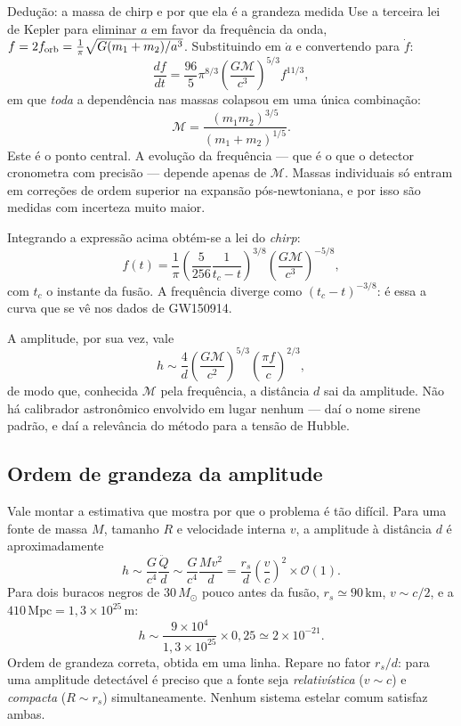 \documentclass[11pt,a4paper]{article}
\begin{document}
\begin{lessonblock}[borderline west={2pt}{0pt}{astroGold}]{Dedução: a massa de chirp e por que ela é a grandeza medida}
Use a terceira lei de Kepler para eliminar $a$ em favor da frequência da onda, $f=2f_{\rm orb}=\frac{1}{\pi}\sqrt{G(m_1+m_2)/a^{3}}$. Substituindo em $\dot{a}$ e convertendo para $\dot{f}$:
\[
\frac{df}{dt}=\frac{96}{5}\pi^{8/3}\left(\frac{G\mathcal{M}}{c^{3}}\right)^{5/3}f^{11/3},
\]
em que \emph{toda} a dependência nas massas colapsou em uma única combinação:
\[
\mathcal{M}=\frac{(m_1m_2)^{3/5}}{(m_1+m_2)^{1/5}}.
\]
Este é o ponto central. A evolução da frequência --- que é o que o detector cronometra com precisão --- depende apenas de $\mathcal{M}$. Massas individuais só entram em correções de ordem superior na expansão pós-newtoniana, e por isso são medidas com incerteza muito maior.

Integrando a expressão acima obtém-se a lei do \textit{chirp}:
\[
f(t)=\frac{1}{\pi}\left(\frac{5}{256}\frac{1}{t_c-t}\right)^{3/8}\left(\frac{G\mathcal{M}}{c^{3}}\right)^{-5/8},
\]
com $t_c$ o instante da fusão. A frequência diverge como $(t_c-t)^{-3/8}$: é essa a curva que se vê nos dados de GW150914.

A amplitude, por sua vez, vale
\[
h\sim\frac{4}{d}\left(\frac{G\mathcal{M}}{c^{2}}\right)^{5/3}\left(\frac{\pi f}{c}\right)^{2/3},
\]
de modo que, conhecida $\mathcal{M}$ pela frequência, a distância $d$ sai da amplitude. Não há calibrador astronômico envolvido em lugar nenhum --- daí o nome sirene padrão, e daí a relevância do método para a tensão de Hubble.
\end{lessonblock}

\subsection*{Ordem de grandeza da amplitude}

Vale montar a estimativa que mostra por que o problema é tão difícil. Para uma fonte de massa $M$, tamanho $R$ e velocidade interna $v$, a amplitude à distância $d$ é aproximadamente
\[
h\sim\frac{G}{c^{4}}\frac{\ddot{Q}}{d}\sim\frac{G}{c^{4}}\frac{Mv^{2}}{d}
=\frac{r_s}{d}\left(\frac{v}{c}\right)^{2}\times\mathcal{O}(1).
\]
Para dois buracos negros de $30\,M_\odot$ pouco antes da fusão, $r_s\simeq90\,\mathrm{km}$, $v\sim c/2$, e a $410\,\mathrm{Mpc}=1{,}3\times10^{25}\,\mathrm{m}$:
\[
h\sim\frac{9\times10^{4}}{1{,}3\times10^{25}}\times0{,}25\simeq2\times10^{-21}.
\]
Ordem de grandeza correta, obtida em uma linha. Repare no fator $r_s/d$: para uma amplitude detectável é preciso que a fonte seja \emph{relativística} ($v\sim c$) e \emph{compacta} ($R\sim r_s$) simultaneamente. Nenhum sistema estelar comum satisfaz ambas.
\end{document}
